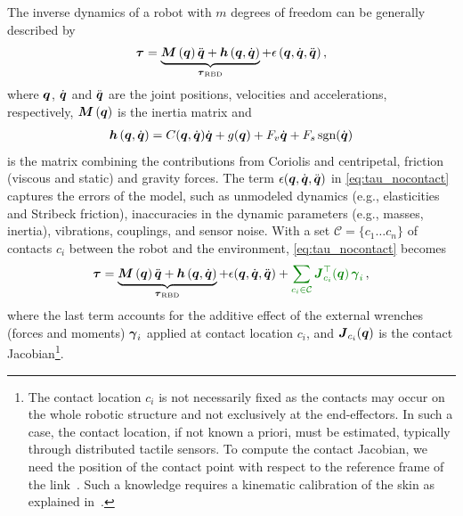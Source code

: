 The inverse dynamics of a robot with $m$ degrees of freedom can be generally described by 
%
\begin{align}
	\boldsymbol {\tau} = \underbrace{\boldsymbol M \left( \boldsymbol q \right)\ddot{\boldsymbol q} + \boldsymbol h \left(\boldsymbol q,\dot{\boldsymbol q} \right)}_{\boldsymbol {\tau}_\text{RBD}} + \epsilon\,(\boldsymbol q,\dot{\boldsymbol q},\ddot{\boldsymbol q}) \,,
	\label{eq:tau_nocontact}
\end{align}
%
where $\boldsymbol q$, $\dot{\boldsymbol q}$ and $\ddot{\boldsymbol q}$ are  the joint positions, velocities and accelerations, respectively, 
$\boldsymbol M \left( \boldsymbol q \right)$ is the inertia matrix and 
%
\begin{align*}
	\Hmatrix = C(\q,\dq)\dq + g(\q) + F_v \dq + F_s \,\text{sgn}(\dq) %
\end{align*}
%
is the matrix combining the contributions from Coriolis and centripetal, friction (viscous and static) and gravity forces.
The term $\epsilon(\boldsymbol q,\dot{\boldsymbol q},\ddot{\boldsymbol q})$ in \eq\eqref{eq:tau_nocontact} captures the errors of the model,
such as unmodeled dynamics (e.g., elasticities and Stribeck friction), inaccuracies in the dynamic parameters (e.g., masses, inertia), vibrations, couplings, and sensor noise. 
%
With a set $\mathcal{C}=\{c_1 \ldots c_n\}$ of contacts $c_i$ between the robot and the environment, \eq\eqref{eq:tau_nocontact} becomes
%
\begin{align}
	\torques = \underbrace{\inertiaMatrix\ddq + \Hmatrix}_{\torques_\text{RBD}} + \epsilon(\q,\dq,\ddq) + \color{darkgreen}{\sum_{c_i \in\mathcal{C}} {\jacobian\T_{c_i}(\q)}\, \extForces_i} \,\color{black}{,}
	\label{eq:tau_contact}
\end{align}
%
where the last term accounts for the additive effect of the external wrenches (forces and moments) $\boldsymbol {\gamma}_i$ applied at contact location $c_i$, and $\boldsymbol J_{c_i}(\boldsymbol q)$  is the contact Jacobian\footnote{The contact location $c_i$ is not necessarily fixed as the contacts may occur on the whole robotic structure and not exclusively at the end-effectors. 
In such a case, the contact location, if not known a priori, must be estimated, typically through distributed tactile sensors.
To compute the contact Jacobian, we need the position of the contact point with respect to the reference frame of the link~\cite{Fumagalli2012}. Such a knowledge requires a kinematic calibration of the skin as explained in~\cite{DelPrete2011}.}.
%



